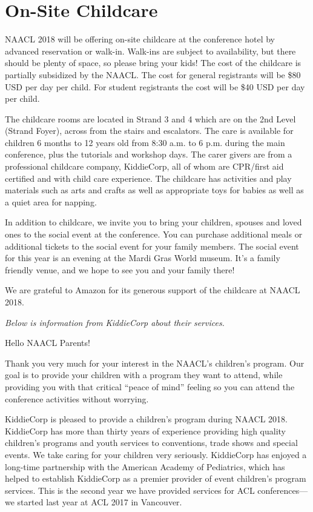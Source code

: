 \chapter{On-Site Childcare}

NAACL 2018 will be offering on-site childcare at the conference hotel by advanced reservation or walk-in.   Walk-ins are subject to availability, but there should be plenty of space, so please bring your kids!  The cost of the childcare is partially subsidized by the NAACL. The cost for general registrants will be \$80 USD per day per child. For student registrants the cost will be \$40 USD per day per child.

The childcare rooms are located in Strand 3 and 4 which are on the 2nd Level (Strand Foyer), across from the stairs and escalators. 
The care is available for children 6 months to 12 years old from 8:30 a.m. to 6 p.m. during the main conference, plus the tutorials and workshop days. The carer givers are from a professional childcare company, KiddieCorp, all of whom are CPR/first aid certified and with child care experience. The childcare has activities and play materials such as arts and crafts as well as appropriate toys for babies as well as a quiet area for napping.  

In addition to childcare, we invite you to bring your children, spouses and loved ones to the social event at the conference. You can purchase additional meals or additional tickets to the social event for your family members. The social event for this year is an evening at the Mardi Gras World museum. It's a family friendly venue, and we hope to see you and your family there!


We are grateful to Amazon for its generous support of the childcare at NAACL 2018.


\emph{Below is information from KiddieCorp about their services.}


Hello NAACL Parents!

Thank you very much for your interest in the NAACL's children's program.
Our goal is to provide your children with a program they want to attend,
while providing you with that critical ``peace of mind'' feeling so you can
attend the conference activities without worrying.

KiddieCorp is pleased to provide a children's program during NAACL 2018.
KiddieCorp has more than thirty years of experience providing high quality
children's programs and youth services to conventions, trade shows and
special events. We take caring for your children very seriously. KiddieCorp
has enjoyed a long-time partnership with the American Academy of Pediatrics,
which has helped to establish KiddieCorp as a premier provider of event
children's program services.  This is the second year we have provided
services for ACL conferences---we started last year at ACL 2017 in
Vancouver. 


